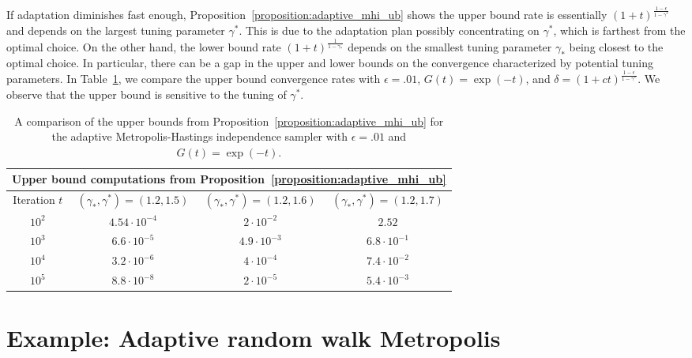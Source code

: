 \documentclass[12pt]{article}
\theoremstyle{plain}
\theoremstyle{remark}
\newcommand{\e}{\epsilon}
\begin{document}
If adaptation diminishes fast enough, Proposition~\ref{proposition:adaptive_mhi_ub} shows the upper bound rate is essentially $(1 + t)^{\frac{1-\e}{1-\gamma^*}}$ and depends on the largest tuning parameter $\gamma^*$. This is due to the adaptation plan possibly concentrating on $\gamma^*$, which is farthest from the optimal choice. On the other hand, the lower bound rate $(1 + t)^{\frac{1}{1-\gamma_*}}$ depends on the smallest tuning parameter $\gamma_*$ being closest to the optimal choice.
In particular, there can be a gap in the upper and lower bounds on the convergence characterized by potential tuning parameters.
In Table~\ref{table:mhi_ub}, we compare the upper bound convergence rates with $\e = .01$, $G(t) = \exp(-t)$, and $\delta = (1 + ct)^{\frac{1-\e}{1-\gamma^*}}$.
We observe that the upper bound is sensitive to the tuning of $\gamma^*$.

\begin{table}
\begin{center}
\renewcommand{\arraystretch}{1.4}
\begin{tabular}[t]{| c | c | c | c |}
\hline
\multicolumn{4}{|c|}{Upper bound computations from Proposition~\ref{proposition:adaptive_mhi_ub}} \\
\hline
 Iteration $t$ & $(\gamma_*, \gamma^*) = (1.2, 1.5)$ & $(\gamma_*, \gamma^*) = (1.2, 1.6)$ & $(\gamma_*, \gamma^*) = (1.2, 1.7)$ \\ 
 \hline
 $10^2$ & $4.54 \cdot 10^{-4}$ & $2 \cdot 10^{-2}$ & $2.52$ 
 \\
 \hline
 $10^3$ & $6.6 \cdot 10^{-5}$ & $4.9 \cdot 10^{-3}$ & $6.8 \cdot 10^{-1}$ 
 \\
 \hline
 $10^4$ & $3.2 \cdot 10^{-6}$ & $4 \cdot 10^{-4}$ & $7.4 \cdot 10^{-2}$ 
 \\
 \hline
 $10^5$ & $8.8 \cdot 10^{-8}$ &  $2 \cdot 10^{-5}$ & $5.4 \cdot 10^{-3}$ 
 \\
 \hline      
\end{tabular}
\end{center}
\caption{A comparison of the upper bounds from Proposition~\ref{proposition:adaptive_mhi_ub} for the adaptive Metropolis-Hastings independence sampler with $\e = .01$ and $G(t) = \exp(-t)$.}
\label{table:mhi_ub}
\end{table}


\section{Example: Adaptive random walk Metropolis}
\label{section:adaptive_rwm}
\end{document}
